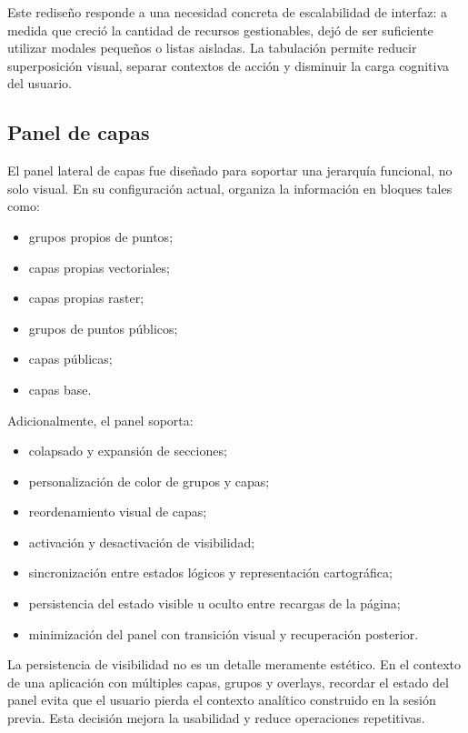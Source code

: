 \documentclass[12pt,a4paper]{report}
\begin{document}
Este redise\~no responde a una necesidad concreta de escalabilidad de interfaz: a medida que creci\'o la cantidad de recursos gestionables, dej\'o de ser suficiente utilizar modales peque\~nos o listas aisladas. La tabulaci\'on permite reducir superposici\'on visual, separar contextos de acci\'on y disminuir la carga cognitiva del usuario.

\subsection{Panel de capas}

El panel lateral de capas fue dise\~nado para soportar una jerarqu\'ia funcional, no solo visual. En su configuraci\'on actual, organiza la informaci\'on en bloques tales como:

\begin{itemize}
    \item grupos propios de puntos;
    \item capas propias vectoriales;
    \item capas propias raster;
    \item grupos de puntos p\'ublicos;
    \item capas p\'ublicas;
    \item capas base.
\end{itemize}

Adicionalmente, el panel soporta:

\begin{itemize}
    \item colapsado y expansi\'on de secciones;
    \item personalizaci\'on de color de grupos y capas;
    \item reordenamiento visual de capas;
    \item activaci\'on y desactivaci\'on de visibilidad;
    \item sincronizaci\'on entre estados l\'ogicos y representaci\'on cartogr\'afica;
    \item persistencia del estado visible u oculto entre recargas de la p\'agina;
    \item minimizaci\'on del panel con transici\'on visual y recuperaci\'on posterior.
\end{itemize}

La persistencia de visibilidad no es un detalle meramente est\'etico. En el contexto de una aplicaci\'on con m\'ultiples capas, grupos y overlays, recordar el estado del panel evita que el usuario pierda el contexto anal\'itico construido en la sesi\'on previa. Esta decisi\'on mejora la usabilidad y reduce operaciones repetitivas.
\end{document}
